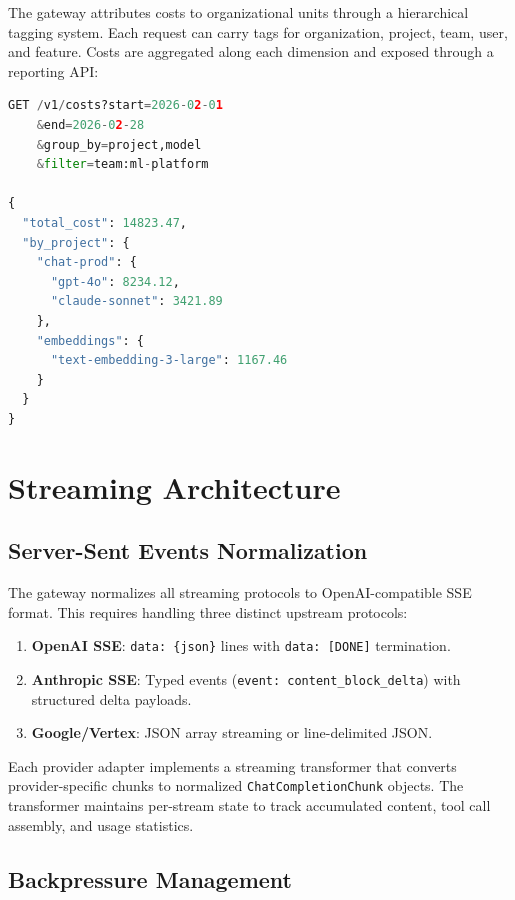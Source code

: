 \documentclass[11pt,twocolumn]{article}
\begin{document}
The gateway attributes costs to organizational units through a hierarchical tagging system. Each request can carry tags for organization, project, team, user, and feature. Costs are aggregated along each dimension and exposed through a reporting API:

\begin{lstlisting}[language=Python, caption=Cost attribution query]
GET /v1/costs?start=2026-02-01
    &end=2026-02-28
    &group_by=project,model
    &filter=team:ml-platform

{
  "total_cost": 14823.47,
  "by_project": {
    "chat-prod": {
      "gpt-4o": 8234.12,
      "claude-sonnet": 3421.89
    },
    "embeddings": {
      "text-embedding-3-large": 1167.46
    }
  }
}
\end{lstlisting}

\section{Streaming Architecture}
\label{sec:streaming}

\subsection{Server-Sent Events Normalization}

The gateway normalizes all streaming protocols to OpenAI-compatible SSE format. This requires handling three distinct upstream protocols:

\begin{enumerate}[leftmargin=*]
    \item \textbf{OpenAI SSE}: \texttt{data: \{json\}} lines with \texttt{data: [DONE]} termination.
    \item \textbf{Anthropic SSE}: Typed events (\texttt{event: content\_block\_delta}) with structured delta payloads.
    \item \textbf{Google/Vertex}: JSON array streaming or line-delimited JSON.
\end{enumerate}

Each provider adapter implements a streaming transformer that converts provider-specific chunks to normalized \texttt{ChatCompletionChunk} objects. The transformer maintains per-stream state to track accumulated content, tool call assembly, and usage statistics.

\subsection{Backpressure Management}
\end{document}
